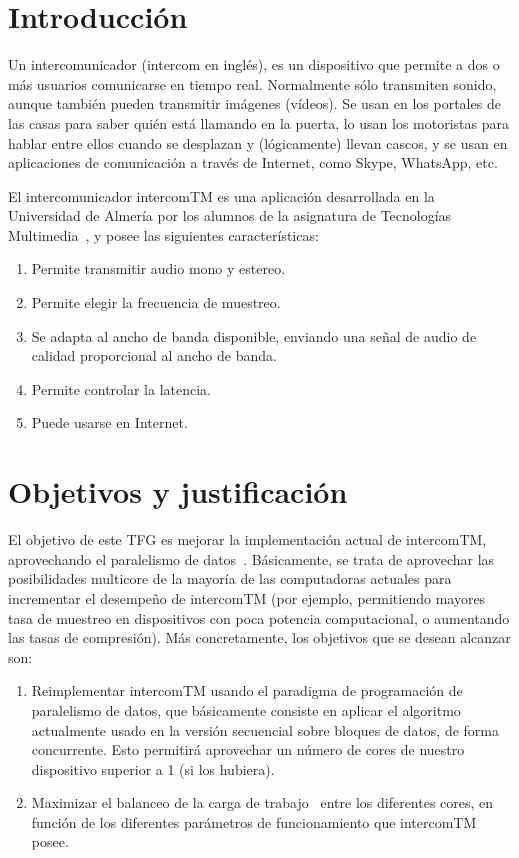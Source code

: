 \documentclass[titlepage, 12pt, a4paper, oneside]{article}
\begin{document}
\normalsize

\section{Introducción}
\label{sec:intro}
Un intercomunicador (intercom en inglés), es un dispositivo que
permite a dos o más usuarios comunicarse en tiempo real. Normalmente
sólo transmiten sonido, aunque también pueden transmitir imágenes
(vídeos). Se usan en los portales de las casas para saber quién está
llamando en la puerta, lo usan los motoristas para hablar entre ellos
cuando se desplazan y (lógicamente) llevan cascos, y se usan en
aplicaciones de comunicación a través de Internet, como Skype,
WhatsApp, etc.

El intercomunicador intercomTM es una aplicación desarrollada en la
Universidad de Almería por los alumnos de la asignatura de Tecnologías
Multimedia~\cite{intercomTM}, y posee las siguientes características:
\begin{enumerate}
\item Permite transmitir audio mono y estereo.
\item Permite elegir la frecuencia de muestreo.
\item Se adapta al ancho de banda disponible, enviando una señal de
  audio de calidad proporcional al ancho de banda.
\item Permite controlar la latencia.
\item Puede usarse en Internet.
\end{enumerate}

\section{Objetivos y justificación}
\label{sec:objetivos}
El objetivo de este TFG es mejorar la implementación actual de
intercomTM, aprovechando el paralelismo de
datos~\cite{pacheco2011introduction}. Básicamente, se trata de
aprovechar las posibilidades multicore de la mayoría de las
computadoras actuales para incrementar el desempeño de intercomTM
(por ejemplo, permitiendo mayores tasa de muestreo en dispositivos con
poca potencia computacional, o aumentando las tasas de
compresión). Más concretamente, los objetivos que se desean alcanzar
son:
\begin{enumerate}
\item Reimplementar intercomTM usando el paradigma de programación de
  paralelismo de datos, que básicamente consiste en aplicar el
  algoritmo actualmente usado en la versión secuencial sobre bloques
  de datos, de forma concurrente. Esto permitirá aprovechar un número
  de cores de nuestro dispositivo superior a 1 (si los hubiera).
\item Maximizar el balanceo de la carga de trabajo~\cite{workload}
  entre los diferentes cores, en función de los diferentes parámetros
  de funcionamiento que intercomTM posee.
\end{enumerate}
\end{document}
